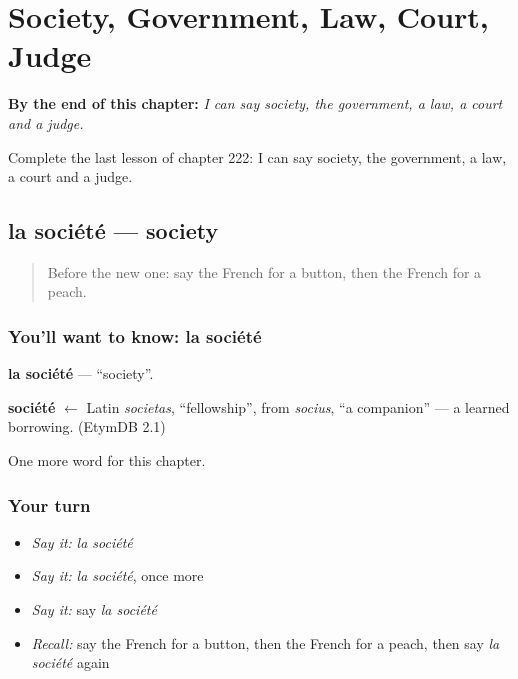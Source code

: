 
\chapter{Society, Government, Law, Court, Judge}
\label{ch:fr-society-government-law-court-judge}

\begin{chapteropening}
\textbf{By the end of this chapter:} \emph{I can say society, the government, a law, a court and a judge.}

Complete the last lesson of chapter 222: I can say society, the government, a law, a court and a judge.
\end{chapteropening}

\section[la société]{la société — society}

\label{lesson:FR-C222-societe}



\begin{quote}
Before the new one: say the French for a button, then the French for a peach.
\end{quote}

\subsection*{You'll want to know: la société}
\textbf{la société} — \textquotedblleft{}society\textquotedblright{}.

\begin{cousinweb}
\textbf{société} $\leftarrow$ Latin \emph{societas}, \textquotedblleft{}fellowship\textquotedblright{}, from \emph{socius}, \textquotedblleft{}a companion\textquotedblright{} — a learned borrowing. (EtymDB 2.1)
\end{cousinweb}

\begin{grammarlens}[title={What you've built}]
One more word for this chapter.
\end{grammarlens}

\subsection*{Your turn}
\begin{itemize}
\raggedright
  \item \emph{Say it:} \emph{la société}
  \item \emph{Say it:} \emph{la société}, once more
  \item \emph{Say it:} say \emph{la société}
  \item \emph{Recall:} say the French for a button, then the French for a peach, then say \emph{la société} again
\end{itemize}

